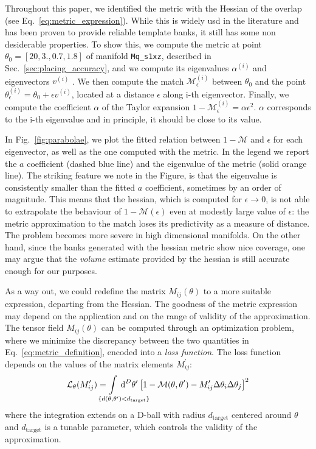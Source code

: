 \documentclass[twocolumn,showpacs,preprintnumbers,nofootinbib,prd,
superscriptaddress,10pt]{revtex4-2}
\newcommand{\dvol}[2]{\ensuremath{\operatorname{d}^{#2}\!{#1}}}
\begin{document}
Throughout this paper, we identified the metric with the Hessian of the overlap (see Eq.~\eqref{eq:metric_expression}). While this is widely usd in the literature and has been proven to provide reliable template banks, it still has some non desiderable properties.
To show this, we compute the metric at point $\theta_0 = [20, 3., 0.7, 1.8]$ of manifold \texttt{Mq\_s1xz}, described in Sec.~\ref{sec:placing_accuracy}, and we compute its eigenvalues $\alpha^{(i)}$ and eigenvectors $v^{(i)}$ . We then compute the match $\mathcal{M}^{(i)}_\epsilon$ between $\theta_0$ and the point $\theta^{(i)}_\epsilon = \theta_0 + \epsilon v^{(i)}$, located at a distance $\epsilon$ along i-th eigenvector.
Finally, we  compute the coefficient $\alpha$ of the Taylor expansion $1 - \mathcal{M}^{(i)}_\epsilon = \alpha  \epsilon^2$.
$\alpha$ corresponds to the i-th eigenvalue and in principle, it should be close to its value.

In Fig.~\ref{fig:parabolae}, we plot the fitted relation between $1 - \mathcal{M}$ and $\epsilon$ for each eigenvector, as well as the one computed with the metric. In the legend we report the $a$ coefficient (dashed blue line) and the eigenvalue of the metric (solid orange line).
The striking feature we note in the Figure, is that the eigenvalue is consistently smaller than the fitted $a$ coefficient, sometimes by an order of magnitude.
This means that the hessian, which is computed for $\epsilon\rightarrow 0$, is not able to extrapolate the behaviour of $1 - \mathcal{M}(\epsilon)$ even at modestly large value of $\epsilon$: the metric approximation to the match loses its predictivity as a measure of distance.
The problem becomes more severe in high dimensional manifolds.
On the other hand, since the banks generated with the hessian metric show nice coverage, one may argue that the {\it volume} estimate provided by the hessian is still accurate enough for our purposes.

As a way out, we could redefine the matrix $M_{ij}(\theta)$ to a more suitable expression, departing from the Hessian.
The goodness of the metric expression may depend on the application and on the range of validity of the approximation.
The tensor field $M_{ij}(\theta)$ can be computed through an optimization problem, where we minimize the discrepancy between the two quantities in Eq.~\eqref{eq:metric_definition}, encoded into a {\it loss function}.
The loss function depends on the values of the matrix elements $M^\prime_{ij}$:
\begin{equation} \label{eq:loss_function}
	\mathcal{L}_\theta(M^\prime_{ij}) = \hspace{-4em} \int\limits_{\hspace{3em}\{d(\theta,\theta^\prime) < d_\mathrm{target}\}} \hspace{-3.8em}
		\dvol{\theta^\prime}{D}  \left[ 1 - \mathcal{M}(\theta,\theta^\prime) - M^\prime_{ij} \Delta\theta_i \Delta\theta_j \right]^2
\end{equation}
where the integration extends on a D-ball with radius $d_\mathrm{target}$ centered around $\theta$ and $d_\mathrm{target}$ is a tunable parameter, which controls the validity of the approximation.
\end{document}
